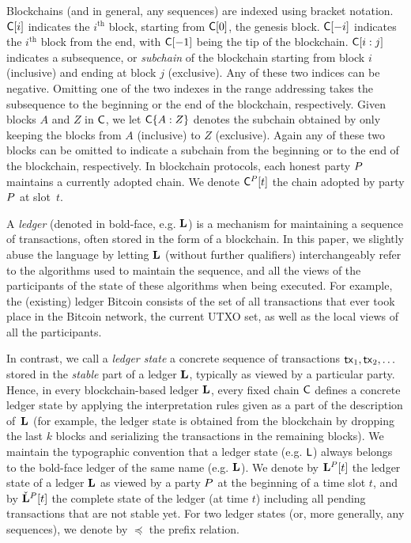 Blockchains (and in general, any sequences) are indexed using bracket notation.
$\mathsf{C}[i]$ indicates the $i^{\text{th}}$ block, starting from $\mathsf{C}[0]$, the
genesis block. $\mathsf{C}[-i]$ indicates the $i^{\text{th}}$ block from the end,
with $\mathsf{C}[-1]$ being the tip of the blockchain. $\mathsf{C}[i:j]$ indicates a
subsequence, or \emph{subchain} of the blockchain starting from block $i$
(inclusive) and ending at block $j$ (exclusive). Any of these two indices can be
negative. Omitting one of the two indexes in the range addressing takes the
subsequence to the beginning or the end of the blockchain, respectively. Given
blocks $A$ and $Z$ in $\mathsf{C}$, we let $\mathsf{C}\{A:Z\}$ denotes the subchain
obtained by only keeping the blocks from $A$ (inclusive) to $Z$ (exclusive).
Again any of these two blocks can be omitted to indicate a subchain from the
beginning or to the end of the blockchain, respectively. In blockchain
protocols, each honest party $P$ maintains a currently adopted chain. We
denote $\mathsf{C}^{P}[t]$ the chain adopted by party $P$ at slot~$t$.

A \emph{ledger} (denoted in bold-face, e.g. $\mathbf{L}$) is a mechanism for
maintaining a sequence of transactions, often stored in the form of a
blockchain.  In this paper, we slightly abuse the language by letting $\mathbf{L}$
(without further qualifiers) interchangeably refer to the algorithms used to
maintain the sequence, and all the views of the participants of the state of
these algorithms when being executed.  For example, the (existing) ledger
Bitcoin consists of the set of all transactions that ever took place in the
Bitcoin network, %
the current UTXO set, as well as the
local views of all the participants.

In contrast, we call a \emph{ledger state}
a concrete sequence of transactions
$\mathsf{tx}_1,\mathsf{tx}_2, \ldots$ stored in the \emph{stable} part of a ledger $\mathbf{L}$, typically as viewed by a
particular party.
Hence, in every blockchain-based ledger $\mathbf{L}$, every fixed
chain $\mathsf{C}$ defines a concrete ledger state %
by applying  the interpretation rules given as a part of the description
of~$\mathbf{L}$ (for example, the ledger state is obtained from the
blockchain by dropping the last $k$ blocks and serializing the transactions in
the remaining blocks).
We maintain the typographic convention that a ledger state (e.g. $\mathsf{L}$) always
belongs to the bold-face ledger of the same name (e.g. $\mathbf{L}$).
We denote by $\mathbf{L}^{P}[t]$ the ledger state of a ledger $\mathbf{L}$ as viewed by a party
$P$ at the beginning of a time slot $t$,
and by $\check{\mathbf{L}}^P[t]$ the complete state of the ledger (at time
$t$) including all
pending transactions that are not stable yet.
For two ledger states (or, more generally, any sequences), we denote by
$\preceq$ the prefix relation.

